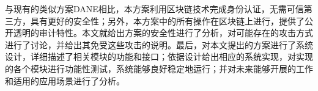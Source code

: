 \begin{cabstract}
与现有的类似方案DANE相比，本方案利用区块链技术完成身份认证，无需可信第三方，具有更好的安全性；另外，本方案中的所有操作在区块链上进行，提供了公开透明的审计特性。本文就给出方案的安全性进行了分析，对可能存在的攻击方式进行了讨论，并给出其免受这些攻击的说明。最后，对本文提出的方案进行了系统设计，详细描述了相关模块的功能和接口；依据设计给出相应的系统实现，对实现的各个模块进行功能性测试，系统能够良好稳定地运行；并对未来能够开展的工作和适用的应用场景进行了分析。



 







\end{cabstract}
